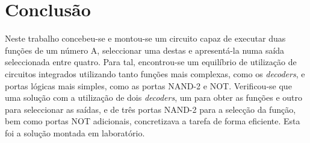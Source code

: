 \documentclass[a4paper,12pt]{article}
\begin{document}
\section{Conclusão}
Neste trabalho concebeu-se e montou-se um circuito capaz de executar duas funções de um número A, seleccionar uma destas e apresentá-la numa saída seleccionada entre quatro. Para tal, encontrou-se um equilíbrio de utilização de circuitos integrados utilizando tanto funções mais complexas, como os {\it decoders}, e portas lógicas mais simples, como as portas NAND-2 e NOT. Verificou-se que uma solução com a utilização de dois {\it decoders}, um para obter as funções e outro para seleccionar as saídas, e de três portas NAND-2 para a selecção da função, bem como portas NOT adicionais, concretizava a tarefa de forma eficiente. Esta foi a solução montada em laboratório.
\end{document}
